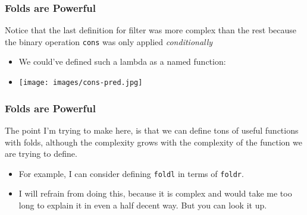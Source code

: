 \documentclass{beamer}
\begin{document}

\begin{frame}
  \frametitle{Folds are Powerful}
  Notice that the last definition for filter was more complex than the
  rest because the binary operation \texttt{cons} was only
  applied \emph{conditionally}
  \begin{itemize}
  \item<2-> We could've defined such a lambda as a named function:
    \consPred
  \item<3-> \texttt{[image: images/cons-pred.jpg]}

  \end{itemize}
\end{frame}

\begin{frame}
  \frametitle{Folds are Powerful}
  The point I'm trying to make here, is that we can define tons of
  useful functions with folds, although the complexity grows with the
  complexity of the function we are trying to define.
  \begin{itemize}
  \item<2-> For example, I can consider defining \texttt{foldl}
    in terms of \texttt{foldr}.
  \item<3-> I will refrain from doing this, because it is complex and would take
    me too long to explain it in even a half decent way. But you can look it up.
  \end{itemize}
\end{frame}


\end{document}
